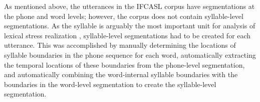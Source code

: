 	
	As mentioned above, the utterances in the IFCASL corpus have %
	segmentations at the phone and word levels; however, the corpus does not contain syllable-level segmentations.
	As the syllable is arguably the most important unit for analysis of lexical stress realization , syllable-level segmentations had to be created for each utterance. This was accomplished by 
	 manually determining the locations of syllable boundaries in the phone sequence for each word, 		%
	 automatically extracting the temporal locations of these %
	 boundaries
	 from the phone-level segmentation, 
	 and automatically combining the word-internal syllable boundaries with the boundaries in the word-level segmentation to create the syllable-level segmentation. 


	

	
%	
%

